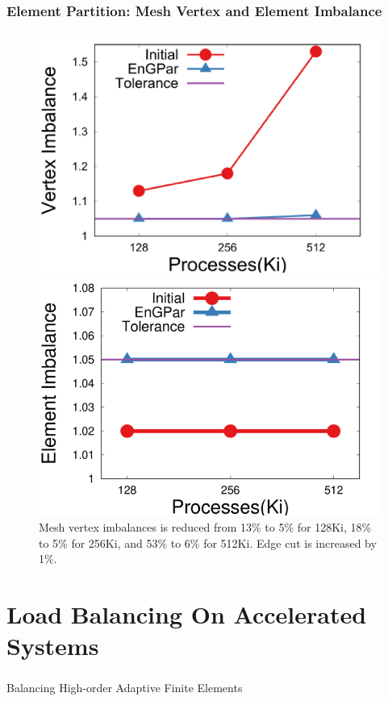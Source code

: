 \documentclass[aspectratio=169]{beamer}
\begin{document}
\begin{frame}
  \frametitle{Element Partition: Mesh Vertex and Element Imbalance}
  \begin{figure}
    \centering
    \includegraphics[width=.49\textwidth]{../accelerated_cse19/figures/elmPtn_vtxImb.png}
    \includegraphics[width=.49\textwidth]{../accelerated_cse19/figures/elmPtn_elmImb.png} \\
    Mesh vertex imbalances is reduced from 13\% to 5\% for 128Ki, 18\% to 5\% for
    256Ki, and 53\% to 6\% for 512Ki.  Edge cut is increased by 1\%.
  \end{figure}
\end{frame}


\section{Load Balancing On Accelerated Systems}

\begin{frame}
  \frametitle{}
  \center \huge{Balancing High-order Adaptive Finite Elements}
\end{frame}
\end{document}
